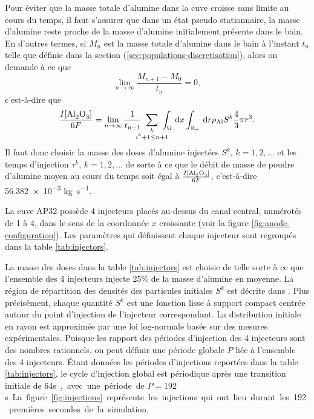 Pour éviter que la masse totale d'alumine dans la cuve croisse sans
limite au cours du temps, il faut s'assurer que dans un état pseudo
stationnaire, la masse d'alumine reste proche de la masse d'alumine
initialement présente dans le bain. En d'autres termes, si $M_n$ est
la masse totale d'alumine dans le bain à l'instant $t_n$ telle que
définie dans la section (\ref{sec:populations-discretisation}), alors
on demande à ce que
\begin{equation*}
\lim_{n\to\infty} \frac{M_{n+1} - M_{0}}{t_n} = 0,
\end{equation*}
c'est-à-dire que
\begin{equation}\label{eq:injection-mass-condition}
  \frac{I[\cee{Al2O3}]}{6F}
  =\lim_{n\to \infty}\frac{1}{t_{n+1}}\ \sum_{\mathclap{\substack{k\\ i^k + 1\leq n +
        1}}}\ \int_\Omega\intd{x}\int_\rplus\intd{r}\aluminadensity S^k \frac{4}{3}\pi r^3.
\end{equation}
Il faut donc choisir la masse des doses d'alumine injectées $S^k$, $k
= 1, 2,\dots$ et les temps d'injection $\tau^k$, $k = 1,2,\dots$ de
sorte à ce que le débit de masse de poudre d'alumine moyen au cours du
temps soit égal à $\frac{I[\cee{Al2O3}]}{6F}$, c'est-à-dire
\num{56.382e-3} \si{\kilo\gram\per\second}.

La cuve AP32 possède 4 injecteurs placés au-dessus du canal central,
numérotés de 1 à 4, dans le sens de la coordonnée $x$ croissante (voir
la figure \ref{fig:anode-configuration}). Les paramètres qui
définissent chaque injecteur sont regroupés dans la table
\ref{tab:injectors}.

La masse des doses dans la table \ref{tab:injectors} est choisie de
telle sorte à ce que l'ensemble des 4 injecteurs injecte 25\% de la
masse d'alumine en moyenne. La région de répartition des densités des particules
initiales $S^k$ est décrite dans \cite{Hofer2011}. Plus précisément,
chaque quantité $S^k$ est une fonction lisse à support
compact centrée autour du point d'injection de l'injecteur
correspondant. La distribution initiale en rayon est approximée
par une loi log-normale basée sur des mesures expérimentales. Puisque
les rapport des périodes d'injection des 4 injecteurs sont des nombres
rationnels, on peut définir une période globale $P$ liée à l'ensemble des
4 injecteurs. Étant données les périodes d'injections reportées dans la table
\ref{tab:injectors}, le cycle d'injection global est périodique après une
transition initiale de \num{64}\si\second, avec une période
de $P = \num{192}$ \si\second. La figure \ref{fig:injections} représente les
injections qui ont lieu durant les \num{192} premières secondes de la
simulation.

